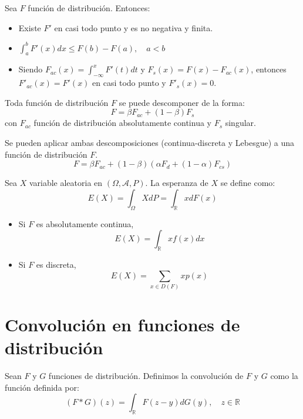 \begin{lemma}
    Sea $F$ función de distribución.
    Entonces:
    \begin{itemize}
        \item Existe $F'$ en casi todo punto y es no negativa y finita.
        \item $\int_a^b F'(x) dx \leq F(b) - F(a), \quad a<b$
        \item Siendo $F_{ac}(x) = \int_{-\infty}^x F'(t) dt$ y $F_s(x) = F(x) - F_{ac}(x)$, entonces $F'_{ac}(x) = F'(x)$ en casi todo punto y $F'_s(x) = 0$.
    \end{itemize}
\end{lemma}

\begin{theorem}
    Toda función de distribución $F$ se puede descomponer de la forma:
    $$F = \beta F_{ac} + (1-\beta)F_s$$
    con $F_{ac}$ función de distribución absolutamente continua y $F_s$ singular.
\end{theorem}

\begin{remark}
    Se pueden aplicar ambas descomposiciones (continua-discreta y Lebesgue) a una función de distribución $F$.
    $$F = \beta F_{ac} + (1-\beta) \left( \alpha F_{d} + (1-\alpha)F_{cs} \right)$$
\end{remark}

\begin{definition}[Esperanza]
    Sea $X$ variable aleatoria en $(\Omega, \mathcal{A}, P)$.
    La esperanza de $X$ se define como:
    $$E(X) = \int_\Omega X dP = \int_\mathbb{R} x dF(x)$$
\end{definition}

\begin{remark}
    \hfill
    \begin{itemize}
        \item Si $F$ es absolutamente continua,
              $$E(X) = \int_\mathbb{R} xf(x) dx$$
        \item Si $F$ es discreta,
              $$E(X) = \sum_{x \in D(F)} xp(x)$$
    \end{itemize}
\end{remark}

\section{Convolución en funciones de distribución}

\begin{definition}
    Sean $F$ y $G$ funciones de distribución.
    Definimos la convolución de $F$ y $G$ como la función definida por:
    $$(F \ast G)(z) = \int_\mathbb{R} F(z-y) dG(y), \quad z \in \mathbb{R}$$
\end{definition}

